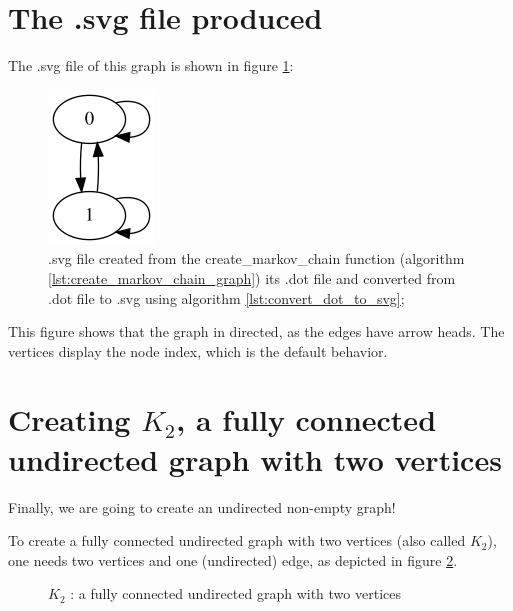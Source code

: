 \section{The .svg file produced}
\label{subsec:create_markov_chain.svg}

The .svg file of this graph is shown in figure \ref{fig:create_markov_chain.svg}:

\begin{figure}[!htbp]
  \includegraphics[]{create_markov_chain.png}
  \caption{
    .svg file created from the create\_markov\_chain function 
    (algorithm \ref{lst:create_markov_chain_graph}) 
    its .dot file and converted from .dot file to .svg using algorithm 
    \ref{lst:convert_dot_to_svg};
  }
  \label{fig:create_markov_chain.svg}
\end{figure}

This figure shows that the graph in directed, as the edges have arrow heads.
The vertices display the node index, which is the default behavior.

\section{Creating $K_{2}$, a fully connected undirected graph with two vertices}
\label{subsec:create_k2_graph}

Finally, we are going to create an undirected non-empty graph!

To create a fully connected undirected graph with two vertices (also called
$K_{2}$), 
one needs two vertices and one (undirected) edge, 
as depicted in figure \ref{fig:k2_graph}.


\begin{figure}
  \caption{$K_{2}$ : a fully connected undirected graph with two vertices}
  \label{fig:k2_graph}
\end{figure}

